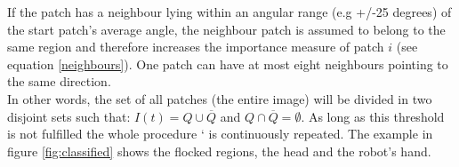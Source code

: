 \documentclass[conference]{IEEEtran}
\begin{document}
If the patch has a neighbour lying within an angular range (e.g +/-25 degrees) of the start patch's average angle, the neighbour patch is assumed to belong to the same region and therefore increases the importance measure of patch $i$ (see equation \ref{neighbours}). One patch can have at most eight neighbours pointing to the same direction. \\
In other words, the set of all patches (the entire image) will be divided in two disjoint sets such that: $I \left( t\right) = Q \cup \overline{Q}$ and $Q \cap \overline{Q} = \emptyset$.
As long as this threshold is not fulfilled the whole procedure `%
 is continuously repeated. The example in figure \ref{fig:classified} shows the flocked regions, the head and the robot's hand. 
\end{document}
